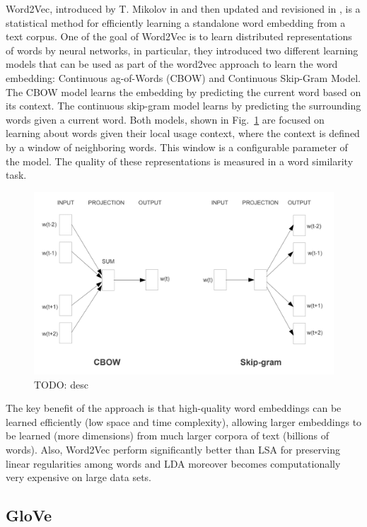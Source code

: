 Word2Vec, introduced by T. Mikolov in  and then
updated and revisioned in , is a statistical
method for efficiently learning a standalone word embedding from a
text corpus. One of the goal of Word2Vec is to learn distributed
representations of words by neural networks, in particular, they
introduced two different learning models that can be used as part of
the word2vec approach to learn the word embedding: Continuous
ag-of-Words (CBOW) and Continuous Skip-Gram Model. The CBOW model
learns the embedding by predicting the current word based on its
context. The continuous skip-gram model learns by predicting the
surrounding words given a current word. Both models, shown in
Fig.~\ref{fig:word2vec-learning-models} are focused on learning about
words given their local usage context, where the context is defined by
a window of neighboring words. This window is a configurable parameter
of the model. The quality of these representations is measured in a
word similarity task.

\begin{figure}
  \includegraphics[width=\textwidth]{figures/word2vec-training-models.png}
  \caption[TODO]{TODO: desc}
  \label{fig:word2vec-learning-models}
\end{figure}

The key benefit of the approach is that high-quality word embeddings
can be learned efficiently (low space and time complexity), allowing
larger embeddings to be learned (more dimensions) from much larger
corpora of text (billions of words). Also, Word2Vec perform
significantly better than LSA for preserving linear regularities among
words and LDA moreover becomes computationally very expensive on
large data sets.

\subsection{GloVe}

